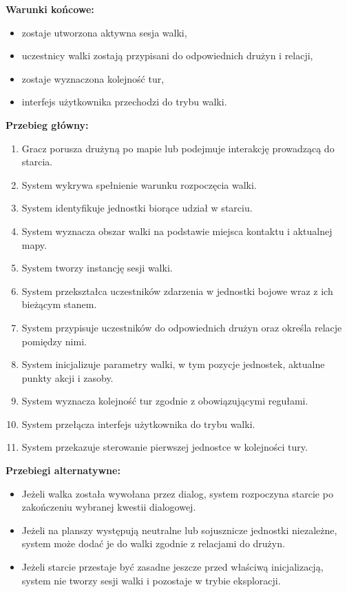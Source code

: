 \textbf{Warunki końcowe:}
\begin{itemize}
    \item zostaje utworzona aktywna sesja walki,
    \item uczestnicy walki zostają przypisani do odpowiednich drużyn i relacji,
    \item zostaje wyznaczona kolejność tur,
    \item interfejs użytkownika przechodzi do trybu walki.
\end{itemize}

\textbf{Przebieg główny:}
\begin{enumerate}
    \item Gracz porusza drużyną po mapie lub podejmuje interakcję prowadzącą do starcia.
    \item System wykrywa spełnienie warunku rozpoczęcia walki.
    \item System identyfikuje jednostki biorące udział w starciu.
    \item System wyznacza obszar walki na podstawie miejsca kontaktu i aktualnej mapy.
    \item System tworzy instancję sesji walki.
    \item System przekształca uczestników zdarzenia w jednostki bojowe wraz z ich bieżącym stanem.
    \item System przypisuje uczestników do odpowiednich drużyn oraz określa relacje pomiędzy nimi.
    \item System inicjalizuje parametry walki, w tym pozycje jednostek, aktualne punkty akcji i zasoby.
    \item System wyznacza kolejność tur zgodnie z obowiązującymi regułami.
    \item System przełącza interfejs użytkownika do trybu walki.
    \item System przekazuje sterowanie pierwszej jednostce w kolejności tury.
\end{enumerate}

\textbf{Przebiegi alternatywne:}
\begin{itemize}
    \item Jeżeli walka została wywołana przez dialog, system rozpoczyna starcie po zakończeniu wybranej kwestii dialogowej.
    \item Jeżeli na planszy występują neutralne lub sojusznicze jednostki niezależne, system może dodać je do walki zgodnie z relacjami do drużyn.
    \item Jeżeli starcie przestaje być zasadne jeszcze przed właściwą inicjalizacją, system nie tworzy sesji walki i pozostaje w trybie eksploracji.
\end{itemize}


